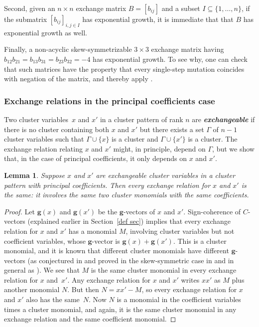 \documentclass[10pt]{article}
\newtheorem{lemma}[proposition]{Lemma}
\theoremstyle{definition}
\theoremstyle{remark}
\numberwithin{equation}{section}
\newcommand{\newword}[1]{\textbf{\emph{#1}}}
\newcommand{\set}[1]{{\lbrace #1 \rbrace}}
\newcommand{\0}{{\mathbf{0}}}
\newcommand{\g}{\mathbf{g}}
\begin{document}
Second, given an $n\times n$ exchange matrix $B=[b_{ij}]$ and a subset $I\subseteq\set{1,\ldots,n}$, if the submatrix $[b_{ij}]_{i,j\in I}$ has exponential growth, it is immediate that that $B$ has exponential growth as well.

Finally, a non-acyclic skew-symmetrizable $3\times3$ exchange matrix having $b_{12}b_{21}=b_{13}b_{31}=b_{23}b_{32}=-4$ has exponential growth.
To see why, one can check that such matrices have the property that every single-step mutation coincides with negation of the matrix, and thereby apply \cite[Theorem~1.1]{FeShThTu12}.

\subsubsection{Exchange relations in the principal coefficients case}\label{exch rel sec}
Two cluster variables~$x$ and $x'$ in a cluster pattern of rank $n$  are \newword{exchangeable} if there is no cluster containing both $x$ and $x'$ but there exists a set $\Gamma$ of $n-1$ cluster variables such that $\Gamma\cup\set{x}$ is a cluster and $\Gamma\cup\set{x'}$ is a cluster.
The exchange relation relating $x$ and $x'$ might, in principle, depend on $\Gamma$, but we show that, in the case of principal coefficients, it only depends on $x$ and $x'$.

\begin{lemma}\label{exch ind}  
Suppose $x$ and $x'$ are exchangeable cluster variables in a cluster pattern with principal coefficients.
Then every exchange relation for $x$ and $x'$ is the same:
it involves the same two cluster monomials with the same coefficients.
\end{lemma}

\begin{proof}
Let $\g(x)$ and $\g(x')$ be the $\g$-vectors of $x$ and $x'$.
Sign-coherence of $C$-vectors (explained earlier in Section~\ref{def sec}) implies that every exchange relation for $x$ and $x'$ has a monomial $M$, involving cluster variables but not coefficient variables, whose $\g$-vector is $\g(x)+\g(x')$.
This is a cluster monomial, and it is known that different cluster monomials have different $\g$-vectors (as conjectured in \cite[Conjecture~7.10]{ca4} and proved in the skew-symmetric case in \cite{CIKLFP} and in general as \cite[Theorem~2.13]{GHKK}).
We see that $M$ is the same cluster monomial in every exchange relation for $x$ and~$x'$.
Any exchange relation for $x$ and $x'$ writes $xx'$ as $M$ plus another monomial $N$.
But then $N=xx'-M$, so every exchange relation for $x$ and $x'$ also has the same~$N$.
Now $N$ is a monomial in the coefficient variables times a cluster monomial, and again, it is the same cluster monomial in any exchange relation and the same coefficient monomial.
\end{proof}
\end{document}
